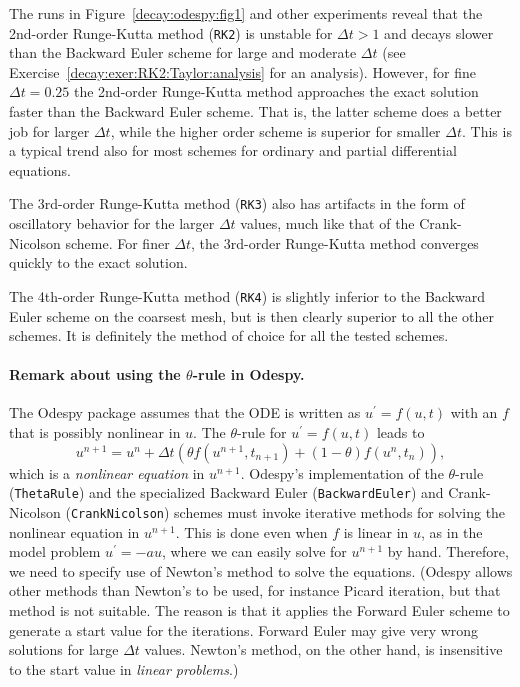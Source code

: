 \documentclass[%
oneside,                 %
final,                   %
10pt]{article}
\begin{document}
The runs in Figure~\ref{decay:odespy:fig1}
and other experiments reveal that the 2nd-order Runge-Kutta
method (\texttt{RK2}) is unstable for $\Delta t>1$ and decays slower than the
Backward Euler scheme for large and moderate $\Delta t$ (see Exercise~\ref{decay:exer:RK2:Taylor:analysis} for an analysis).  However, for
fine $\Delta t = 0.25$ the 2nd-order Runge-Kutta method approaches
the exact solution faster than the Backward Euler scheme.  That is,
the latter scheme does a better job for larger $\Delta t$, while the
higher order scheme is superior for smaller $\Delta t$. This is a
typical trend also for most schemes for ordinary and partial
differential equations.

The 3rd-order Runge-Kutta method (\texttt{RK3}) also has artifacts in the form
of oscillatory behavior for the larger $\Delta t$ values, much
like that of the Crank-Nicolson scheme. For finer $\Delta t$,
the 3rd-order Runge-Kutta method converges quickly to the exact
solution.

The 4th-order Runge-Kutta method (\texttt{RK4}) is slightly inferior
to the Backward Euler scheme on the coarsest mesh, but is then
clearly superior to all the other schemes. It is definitely the
method of choice for all the tested schemes.


\paragraph{Remark about using the $\theta$-rule in Odespy.}
The Odespy package assumes that the ODE is written as $u^{\prime}=f(u,t)$ with
an $f$ that is possibly nonlinear in $u$. The $\theta$-rule for
$u^{\prime}=f(u,t)$ leads to
\[ u^{n+1} = u^{n} + \Delta t\left(\theta f(u^{n+1}, t_{n+1})
+ (1-\theta) f(u^{n}, t_{n})\right),\]
which is a \emph{nonlinear equation} in $u^{n+1}$. Odespy's implementation
of the $\theta$-rule (\texttt{ThetaRule}) and the specialized Backward Euler
(\texttt{BackwardEuler}) and Crank-Nicolson (\texttt{CrankNicolson}) schemes
must invoke iterative methods for
solving the nonlinear equation in $u^{n+1}$. This is done even when
$f$ is linear in $u$, as in the model problem $u^{\prime}=-au$, where we can
easily solve for $u^{n+1}$ by hand.  Therefore, we need to specify
use of Newton's method to solve the equations.
(Odespy allows other methods than Newton's to be used, for instance
Picard iteration, but that method is not suitable. The reason is that it
applies the Forward Euler scheme to generate a start value for
the iterations. Forward Euler may give very wrong solutions
for large $\Delta t$ values. Newton's method, on the other hand,
is insensitive to the start value in \emph{linear problems}.)
\end{document}
